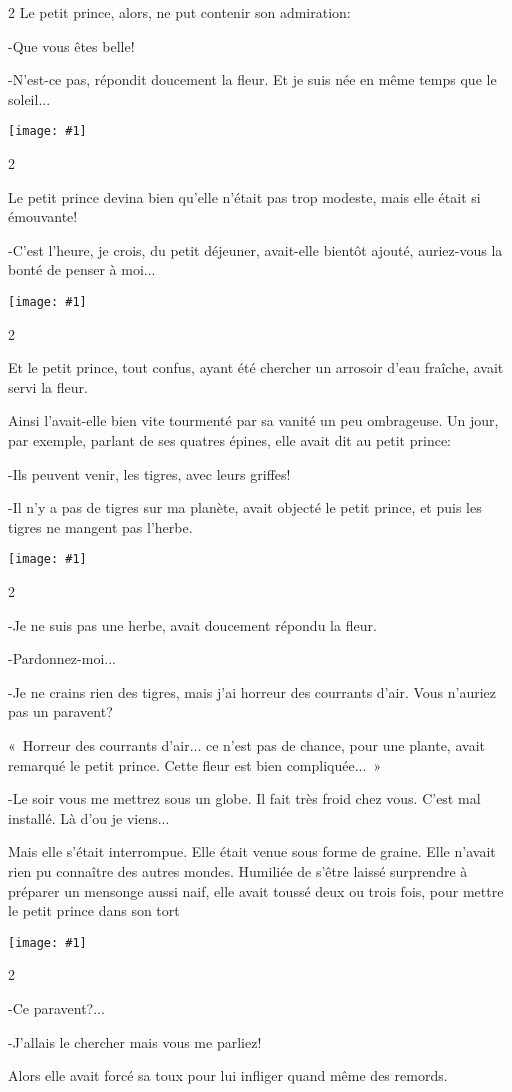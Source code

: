 \documentclass{report}
\newcommand{\incpic}[1]{%
\end{paracol}
\begin{center}
    \texttt{[image: \#1]}
\end{center}
\begin{paracol}{2}}
\begin{document}
\begin{paracol}{2}
Le petit prince, alors, ne put contenir son admiration:

-Que vous êtes belle!

-N'est-ce pas, répondit doucement la fleur. Et je suis née en même temps que le soleil...

\incpic{pic/image18.jpeg}

Le petit prince devina bien qu'elle n'était pas trop modeste, mais elle était si émouvante!

-C'est l'heure, je crois, du petit déjeuner, avait-elle bientôt ajouté, auriez-vous la bonté de penser à moi...

\incpic{pic/image19.jpeg}

Et le petit prince, tout confus, ayant été chercher un arrosoir d'eau fraîche, avait servi la fleur.

Ainsi l'avait-elle bien vite tourmenté par sa vanité un peu ombrageuse. Un jour, par exemple, parlant de ses quatres épines, elle avait dit au petit prince:

-Ils peuvent venir, les tigres, avec leurs griffes!

-Il n'y a pas de tigres sur ma planète, avait objecté le petit prince, et puis les tigres ne mangent pas l'herbe. 

\incpic{pic/image20.jpeg}

-Je ne suis pas une herbe, avait doucement répondu la fleur.

-Pardonnez-moi...

-Je ne crains rien des tigres, mais j'ai horreur des courrants d'air. Vous n'auriez pas un paravent?

«~Horreur des courrants d'air... ce n'est pas de chance, pour une plante, avait remarqué le petit prince. Cette fleur est bien compliquée...~»

-Le soir vous me mettrez sous un globe. Il fait très froid chez vous. C'est mal installé. Là d'ou je viens...

Mais elle s'était interrompue. Elle était venue sous forme de graine. Elle n'avait rien pu connaître des autres mondes. Humiliée de s'être laissé surprendre à préparer un mensonge aussi naif, elle avait toussé deux ou trois fois, pour mettre le petit prince dans son tort 

\incpic{pic/image21.jpeg}

-Ce paravent?...

-J'allais le chercher mais vous me parliez!

Alors elle avait forcé sa toux pour lui infliger quand même des remords.


\end{paracol}
\end{document}
